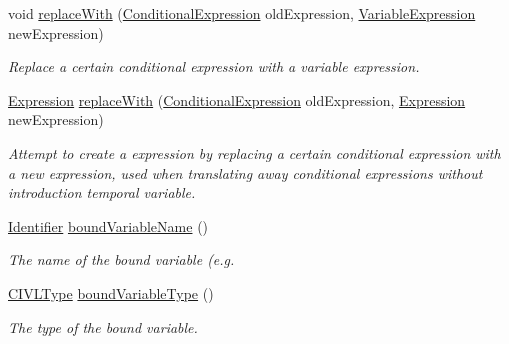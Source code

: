 \begin{DoxyCompactItemize}
\item 
void \hyperlink{classedu_1_1udel_1_1cis_1_1vsl_1_1civl_1_1model_1_1common_1_1expression_1_1CommonQuantifiedExpression_af085144a057718032b99ca949af7f63a}{replace\+With} (\hyperlink{interfaceedu_1_1udel_1_1cis_1_1vsl_1_1civl_1_1model_1_1IF_1_1expression_1_1ConditionalExpression}{Conditional\+Expression} old\+Expression, \hyperlink{interfaceedu_1_1udel_1_1cis_1_1vsl_1_1civl_1_1model_1_1IF_1_1expression_1_1VariableExpression}{Variable\+Expression} new\+Expression)
\begin{DoxyCompactList}\small\item\em Replace a certain conditional expression with a variable expression. \end{DoxyCompactList}\item 
\hyperlink{interfaceedu_1_1udel_1_1cis_1_1vsl_1_1civl_1_1model_1_1IF_1_1expression_1_1Expression}{Expression} \hyperlink{classedu_1_1udel_1_1cis_1_1vsl_1_1civl_1_1model_1_1common_1_1expression_1_1CommonQuantifiedExpression_abd79b78ae6a0496984068703d133507a}{replace\+With} (\hyperlink{interfaceedu_1_1udel_1_1cis_1_1vsl_1_1civl_1_1model_1_1IF_1_1expression_1_1ConditionalExpression}{Conditional\+Expression} old\+Expression, \hyperlink{interfaceedu_1_1udel_1_1cis_1_1vsl_1_1civl_1_1model_1_1IF_1_1expression_1_1Expression}{Expression} new\+Expression)
\begin{DoxyCompactList}\small\item\em Attempt to create a expression by replacing a certain conditional expression with a new expression, used when translating away conditional expressions without introduction temporal variable. \end{DoxyCompactList}\item 
\hyperlink{interfaceedu_1_1udel_1_1cis_1_1vsl_1_1civl_1_1model_1_1IF_1_1Identifier}{Identifier} \hyperlink{classedu_1_1udel_1_1cis_1_1vsl_1_1civl_1_1model_1_1common_1_1expression_1_1CommonQuantifiedExpression_a2075f3abc133be31320bfe711573fd03}{bound\+Variable\+Name} ()
\begin{DoxyCompactList}\small\item\em The name of the bound variable (e.\+g. \end{DoxyCompactList}\item 
\hyperlink{interfaceedu_1_1udel_1_1cis_1_1vsl_1_1civl_1_1model_1_1IF_1_1type_1_1CIVLType}{C\+I\+V\+L\+Type} \hyperlink{classedu_1_1udel_1_1cis_1_1vsl_1_1civl_1_1model_1_1common_1_1expression_1_1CommonQuantifiedExpression_a925e0b6ec37bb43fd7c79005c1e5964e}{bound\+Variable\+Type} ()
\begin{DoxyCompactList}\small\item\em The type of the bound variable. \end{DoxyCompactList}\item 

\end{DoxyCompactItemize}

